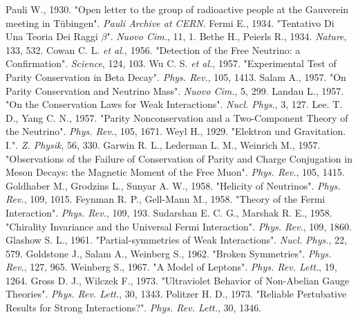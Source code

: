 \documentclass[english]{article}
\begin{document}
\begin{thebibliography}{1}
    Pauli W., 1930. "Open letter to the group of radioactive people at the Gauverein meeting in T\"{u}bingen". \textit{Pauli Archive at CERN}.
    Fermi E., 1934. "Tentativo Di Una Teoria Dei Raggi $\beta$". \textit{Nuovo Cim.}, 11, 1.
    Bethe H., Peierls R., 1934. \textit{Nature}, 133, 532.
    Cowan C. L. \textit{et al.}, 1956. "Detection of the Free Neutrino: a Confirmation". \textit{Science}, 124, 103.
    Wu C. S. \textit{et al.}, 1957. "Experimental Test of Parity Conservation in Beta Decay". \textit{Phys. Rev.}, 105, 1413.
    Salam A., 1957. "On Parity Conservation and Neutrino Mass". \textit{Nuovo Cim.}, 5, 299.
    Landau L., 1957. "On the Conservation Laws for Weak Interactions". \textit{Nucl. Phys.}, 3, 127.
    Lee. T. D., Yang C. N., 1957. "Parity Nonconservation and a Two-Component Theory of the Neutrino". \textit{Phys. Rev.}, 105, 1671.
    Weyl H., 1929. "Elektron und Gravitation. I.". \textit{Z. Physik}, 56, 330.
    Garwin R. L., Lederman L. M., Weinrich M., 1957. "Observations of the Failure of Conservation of Parity and Charge Conjugation in Meson Decays: the Magnetic Moment of the Free Muon". \textit{Phys. Rev.}, 105, 1415.
    Goldhaber M., Grodzins L., Sunyar A. W., 1958. "Helicity of Neutrinos". \textit{Phys. Rev.}, 109, 1015.
    Feynman R. P., Gell-Mann M., 1958. "Theory of the Fermi Interaction". \textit{Phys. Rev.}, 109, 193.
    Sudarshan E. C. G., Marshak R. E., 1958. "Chirality Invariance and the Universal Fermi Interaction". \textit{Phys. Rev.}, 109, 1860.
    Glashow S. L., 1961. "Partial-symmetries of Weak Interactions". \textit{Nucl. Phys.}, 22, 579.
    Goldstone J., Salam A., Weinberg S., 1962. "Broken Symmetries". \textit{Phys. Rev.}, 127, 965.
    Weinberg S., 1967. "A Model of Leptons". \textit{Phys. Rev. Lett.}, 19, 1264.
    Gross D. J., Wilczek F., 1973. "Ultraviolet Behavior of Non-Abelian Gauge Theories". \textit{Phys. Rev. Lett.}, 30, 1343.
    Politzer H. D., 1973. "Reliable Pertubative Results for Strong Interactions?". \textit{Phys. Rev. Lett.}, 30, 1346.
    
\end{thebibliography}
\end{document}
